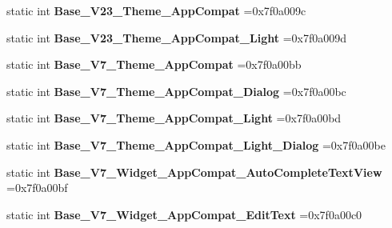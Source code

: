 \begin{DoxyCompactItemize}
static int {\bfseries Base\+\_\+\+V23\+\_\+\+Theme\+\_\+\+App\+Compat} =0x7f0a009c
\item 
\mbox{\label{classandroid_1_1support_1_1v4_1_1R_1_1style_a754e95c991738dad7c1e4a597cc5b19e}} 
static int {\bfseries Base\+\_\+\+V23\+\_\+\+Theme\+\_\+\+App\+Compat\+\_\+\+Light} =0x7f0a009d
\item 
\mbox{\label{classandroid_1_1support_1_1v4_1_1R_1_1style_a950c3425f975e9f1bd1da498ea047266}} 
static int {\bfseries Base\+\_\+\+V7\+\_\+\+Theme\+\_\+\+App\+Compat} =0x7f0a00bb
\item 
\mbox{\label{classandroid_1_1support_1_1v4_1_1R_1_1style_a6b650a4947d391e05dfbe24480b65ce0}} 
static int {\bfseries Base\+\_\+\+V7\+\_\+\+Theme\+\_\+\+App\+Compat\+\_\+\+Dialog} =0x7f0a00bc
\item 
\mbox{\label{classandroid_1_1support_1_1v4_1_1R_1_1style_a77a68e5bc63eec47d0244acddd05777e}} 
static int {\bfseries Base\+\_\+\+V7\+\_\+\+Theme\+\_\+\+App\+Compat\+\_\+\+Light} =0x7f0a00bd
\item 
\mbox{\label{classandroid_1_1support_1_1v4_1_1R_1_1style_ae296387161fe2d9cedbfb4e2fe25096b}} 
static int {\bfseries Base\+\_\+\+V7\+\_\+\+Theme\+\_\+\+App\+Compat\+\_\+\+Light\+\_\+\+Dialog} =0x7f0a00be
\item 
\mbox{\label{classandroid_1_1support_1_1v4_1_1R_1_1style_aa08493f6b94bd110b5d4eace9891870b}} 
static int {\bfseries Base\+\_\+\+V7\+\_\+\+Widget\+\_\+\+App\+Compat\+\_\+\+Auto\+Complete\+Text\+View} =0x7f0a00bf
\item 
\mbox{\label{classandroid_1_1support_1_1v4_1_1R_1_1style_a7f4b1ed0d3bbc67d3bc02610301ec995}} 
static int {\bfseries Base\+\_\+\+V7\+\_\+\+Widget\+\_\+\+App\+Compat\+\_\+\+Edit\+Text} =0x7f0a00c0
\item 
\mbox{\label{classandroid_1_1support_1_1v4_1_1R_1_1style_af439b1df8ae09f9c86f320f7bee05ee5}} 

\end{DoxyCompactItemize}
